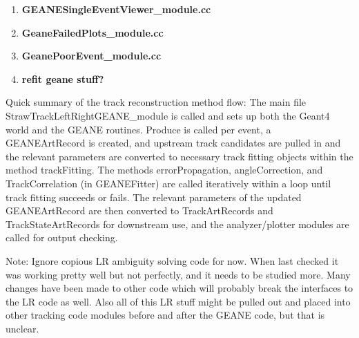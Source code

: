 \documentclass{article}
\begin{document}
\begin{enumerate}
      \item{\bf{GEANESingleEventViewer\_module.cc}} \\

      \item{\bf{GeaneFailedPlots\_module.cc}} \\

      \item{\bf{GeanePoorEvent\_module.cc}} \\

      \item{\bf{refit geane stuff?}} \\

    \end{enumerate}


    Quick summary of the track reconstruction method flow: The main file StrawTrackLeftRightGEANE\_module is called and sets up both the Geant4 world and the GEANE routines. Produce is called per event, a GEANEArtRecord is created, and upstream track candidates are pulled in and the relevant parameters are converted to necessary track fitting objects within the method trackFitting. The methods errorPropagation, angleCorrection, and TrackCorrelation (in GEANEFitter) are called iteratively within a loop until track fitting succeeds or fails. The relevant parameters of the updated GEANEArtRecord are then converted to TrackArtRecords and TrackStateArtRecords for downstream use, and the analyzer/plotter modules are called for output checking.

    Note: Ignore copious LR ambiguity solving code for now. When last checked it was working pretty well but not perfectly, and it needs to be studied more. Many changes have been made to other code which will probably break the interfaces to the LR code as well. Also all of this LR stuff might be pulled out and placed into other tracking code modules before and after the GEANE code, but that is unclear.
\end{document}
